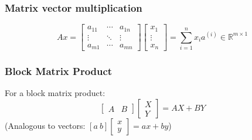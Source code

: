     \subsubsection{Matrix vector multiplication}
    \begin{definition}
        \begin{equation*}
            Ax = \begin{bmatrix}
                a_{11} & \cdots & a_{1n} \\
                \vdots & \ddots & \vdots \\
                a_{m1} & \cdots & a_{mn} 
            \end{bmatrix}
            \begin{bmatrix}
                    x_{1} \\
                    \vdots \\ 
                    x_{n}
            \end{bmatrix}
            = \sum_{i=1}^{n} x_i a^{(i)} \in \mathbb{R}^{m \times 1}
        \end{equation*}
    \end{definition}

    \subsubsection{Block Matrix Product}
    \begin{definition}
        For a block matrix product:
        \begin{equation}
            \begin{bmatrix}
                A & B
                \end{bmatrix}
                \begin{bmatrix}
                X \\ Y
                \end{bmatrix}
                = AX + BY
        \end{equation}
        (Analogous to vectors: \( [a \ b] \begin{bmatrix} x \\ y \end{bmatrix} = a x + b y \))
    \end{definition}

